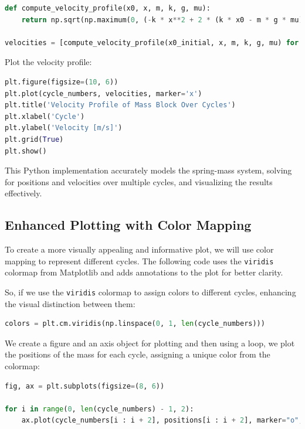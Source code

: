 \documentclass[12pt, a4paper, oneside]{report}
\begin{document}
\begin{lstlisting}[language=Python, caption={Computing the velocity profile}]
def compute_velocity_profile(x0, x, m, k, g, mu):
    return np.sqrt(np.maximum(0, (-k * x**2 + 2 * (k * x0 - m * g * mu) * x) / m))

velocities = [compute_velocity_profile(x0_initial, x, m, k, g, mu) for x in positions]
\end{lstlisting}

Plot the velocity profile:

\begin{lstlisting}[language=Python, caption={Plotting the velocity profile}]
plt.figure(figsize=(10, 6))
plt.plot(cycle_numbers, velocities, marker='x')
plt.title('Velocity Profile of Mass Block Over Cycles')
plt.xlabel('Cycle')
plt.ylabel('Velocity [m/s]')
plt.grid(True)
plt.show()
\end{lstlisting}

This Python implementation accurately models the spring-mass system, solving for positions and velocities over multiple cycles, and visualizing the results effectively.





\subsection*{Enhanced Plotting with Color Mapping}

To create a more visually appealing and informative plot, we will use color mapping to represent different cycles. The following code uses the \texttt{viridis} colormap from Matplotlib and adds annotations to the plot for better clarity.


So, if we use the \texttt{viridis} colormap to assign colors to different cycles, enhancing the visual distinction between them:

\begin{lstlisting}[language=Python, caption={Color Mapping}]
colors = plt.cm.viridis(np.linspace(0, 1, len(cycle_numbers)))
\end{lstlisting}

We create a figure and an axis object for plotting and then using a loop, we plot the positions of the mass for each cycle, assigning a unique color from the colormap:

\begin{lstlisting}[language=Python, caption={Figure and Axes Setup, Plotting Cycles}]
fig, ax = plt.subplots(figsize=(8, 6))

for i in range(0, len(cycle_numbers) - 1, 2):
    ax.plot(cycle_numbers[i : i + 2], positions[i : i + 2], marker="o", color=colors[i])
\end{lstlisting}
\end{document}
